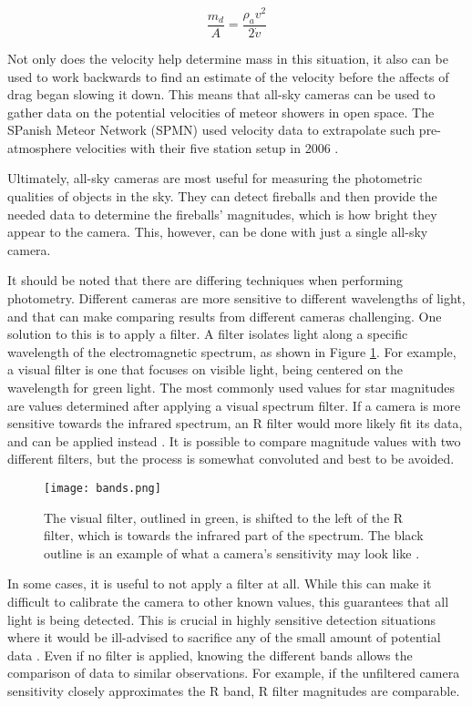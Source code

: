 \begin{equation} \label{eq:mass}
	\frac{m_d}{A} = \frac{\rho_a v^2}{2 \dot v}
\end{equation}

Not only does the velocity help determine mass in this situation, it also can be used to work backwards to find an estimate of the velocity before the affects of drag began slowing it down. This means that all-sky cameras can be used to gather data on the potential velocities of meteor showers in open space. The SPanish Meteor Network (SPMN) used velocity data to extrapolate such pre-atmosphere velocities with their five station setup in 2006 \cite{Trigo-Rodriguez2007}. 

Ultimately, all-sky cameras are most useful for measuring the photometric qualities of objects in the sky. They can detect fireballs and then provide the needed data to determine the fireballs' magnitudes, which is how bright they appear to the camera. This, however, can be done with just a single all-sky camera.

It should be noted that there are differing techniques when performing photometry. Different cameras are more sensitive to different wavelengths of light, and that can make comparing results from different cameras challenging. One solution to this is to apply a filter. A filter isolates light along a specific wavelength of the electromagnetic spectrum, as shown in Figure \ref{fig:bands}. For example, a visual filter is one that focuses on visible light, being centered on the wavelength for green light. The most commonly used values for star magnitudes are values determined after applying a visual spectrum filter. If a camera is more sensitive towards the infrared spectrum, an R filter would more likely fit its data, and can be applied instead \cite{Suggs2014}. It is possible to compare magnitude values with two different filters, but the process is somewhat convoluted and best to be avoided.

\begin{figure}[ht!]
	\centering
	\texttt{[image: bands.png]}
	\caption{The visual filter, outlined in green, is shifted to the left of the R filter, which is towards the infrared part of the spectrum. The black outline is an example of what a camera's sensitivity may look like \protect\cite{Suggs2017}.}
	\label{fig:bands}
\end{figure}


In some cases, it is useful to not apply a filter at all. While this can make it difficult to calibrate the camera to other known values, this guarantees that all light is being detected. This is crucial in highly sensitive detection situations where it would be ill-advised to sacrifice any of the small amount of potential data \cite{Rembold2015}. Even if no filter is applied, knowing the different bands allows the comparison of data to similar observations. For example, if the unfiltered camera sensitivity closely approximates the R band, R filter magnitudes are comparable.

